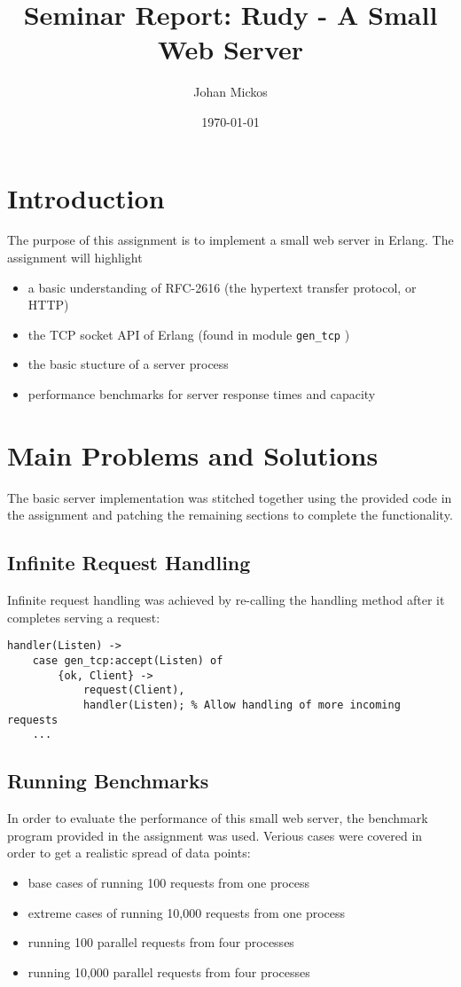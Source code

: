 \documentclass[a4paper, 11pt]{article}
\title{Seminar Report: Rudy - A Small Web Server}
\author{Johan Mickos}
\date{\today{}}
\begin{document}
\maketitle

\section{Introduction}

The purpose of this assignment is to implement a small web server in Erlang. The assignment will highlight
\begin{itemize}
    \item a basic understanding of RFC-2616 (the hypertext transfer protocol, or HTTP)
    \item the TCP socket API of Erlang (found in module \texttt{gen\_tcp} )
    \item the basic stucture of a server process
    \item performance benchmarks for server response times and capacity
\end{itemize}

\section{Main Problems and Solutions}

The basic server implementation was stitched together using the provided code in the assignment and patching the remaining sections to complete the functionality.

\subsection{Infinite Request Handling}
Infinite request handling was achieved by re-calling the handling method after it completes serving a request:
\begin{verbatim}
handler(Listen) ->
    case gen_tcp:accept(Listen) of
        {ok, Client} ->
            request(Client),
            handler(Listen); % Allow handling of more incoming requests
    ...
\end{verbatim}

\subsection{Running Benchmarks}
In order to evaluate the performance of this small web server, the benchmark program provided in the assignment was used. Verious cases were covered in order to get a realistic spread of data points:
\begin{itemize}
    \item base cases of running 100 requests from one process
    \item extreme cases of running 10,000 requests from one process
    \item running 100 parallel requests from four processes
    \item running 10,000 parallel requests from four processes
\end{itemize}
\end{document}
